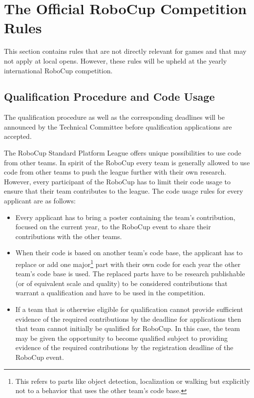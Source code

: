 \documentclass[12pt]{article}
\begin{document}
\newpage


\appendix
\section{The Official RoboCup Competition Rules}
\label{sec:comRules}
This section contains rules that are not directly relevant for games and that may not apply at local opens.  However, these rules will be upheld at the yearly international RoboCup competition.

\subsection{Qualification Procedure and Code Usage}

The qualification procedure as well as the corresponding deadlines will be announced by the Technical Committee before qualification applications are accepted.

The RoboCup Standard Platform League offers unique possibilities to use code from other teams. In spirit of the RoboCup every team is generally allowed to use code from other teams to push the league further with their own research. However, every participant of the RoboCup has to limit their code usage to ensure that their team contributes to the league. The code usage rules for every applicant are as follows:
\begin{itemize}
  \item Every applicant has to bring a poster containing the team's contribution, focused on the current year, to the RoboCup event to share their contributions with the other teams.
  \item When their code is based on another team's code base, the applicant has to replace or add one major\footnote{This refers to parts like object detection, localization or walking but explicitly not to a behavior that uses the other team's code base.} part with their own code for each year the other team's code base is used. The replaced parts have to be research publishable (or of equivalent scale and quality) to be considered contributions that warrant a qualification and have to be used in the competition.
  \item If a team that is otherwise eligible for qualification cannot provide sufficient evidence of the required contributions by the deadline for applications then that team cannot initially be qualified for RoboCup. In this case, the team may be given the opportunity to become qualified subject to providing evidence of the required contributions by the registration deadline of the RoboCup event.
\end{itemize}
\end{document}
